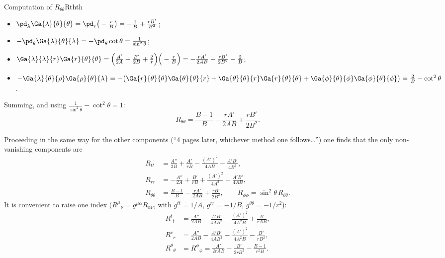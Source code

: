 \begin{example}{Computation of $R_{\theta\theta}$}{Rthth}
\begin{itemize}[nosep]
\item $\pd_\lambda\Ga{\lambda}{\theta}{\theta}=\pd_r\big(-\frac rB\big)=-\frac1B+\frac{rB'}{B^2}$;
\item $-\pd_\theta\Ga{\lambda}{\theta}{\lambda}=-\pd_\theta\cot\theta=\frac{1}{\sin^2\theta}$;
\item $\Ga{\lambda}{\lambda}{r}\Ga{r}{\theta}{\theta}=\Big(\frac{A'}{2A}+\frac{B'}{2B}+\frac2r\Big)\Big(-\frac rB\Big)=-\frac{rA'}{2AB}-\frac{rB'}{2B^2}-\frac2B$;
\item $-\Ga{\lambda}{\theta}{\rho}\Ga{\rho}{\theta}{\lambda}=-\big(\Ga{r}{\theta}{\theta}\Ga{\theta}{\theta}{r}+\Ga{\theta}{\theta}{r}\Ga{r}{\theta}{\theta}+\Ga{\phi}{\theta}{\phi}\Ga{\phi}{\theta}{\phi}\big)=\frac2B-\cot^2\theta$.
\end{itemize}
Summing, and using $\frac1{\sin^2\theta}-\cot^2\theta=1$:
\[
  R_{\theta\theta}=\frac{B-1}{B}-\frac{rA'}{2AB}+\frac{rB'}{2B^2}.
\]
\end{example}
Proceeding in the same way for the other components (``4 pages later, whichever method one follows\dots'') one finds that the only non-vanishing components are
\begin{align}
  R_{tt}&=\frac{A''}{2B}+\frac{A'}{rB}-\frac{(A')^2}{4AB}-\frac{A'B'}{4B^2},\nonumber\\
  R_{rr}&=-\frac{A''}{2A}+\frac{B'}{rB}+\frac{(A')^2}{4A^2}+\frac{A'B'}{4AB},\nonumber\\
  R_{\theta\theta}&=\frac{B-1}{B}-\frac{rA'}{2AB}+\frac{rB'}{2B^2},\qquad R_{\phi\phi}=\sin^2\theta\,R_{\theta\theta}.
  \label{eq:ricci-static}
\end{align}
It is convenient to raise one index ($R^\mu{}_\nu=g^{\mu\alpha}R_{\alpha\nu}$, with $g^{tt}=1/A$, $g^{rr}=-1/B$, $g^{\theta\theta}=-1/r^2$):
\begin{align}
  R^t{}_t&=\frac{A''}{2AB}-\frac{A'B'}{4AB^2}-\frac{(A')^2}{4A^2B}+\frac{A'}{rAB},\nonumber\\
  R^r{}_r&=\frac{A''}{2AB}-\frac{A'B'}{4AB^2}-\frac{(A')^2}{4A^2B}-\frac{B'}{rB^2},\nonumber\\
  R^\theta{}_\theta&=R^\phi{}_\phi=\frac{A'}{2rAB}-\frac{B'}{2rB^2}-\frac{B-1}{r^2B}.
\end{align}

